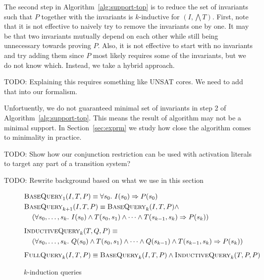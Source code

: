 The second step in Algorithm~\ref{alg:support-top} is to reduce the
set of invariants such that $P$ together with the invariants is
$k$-inductive for $(I, \bigwedge T)$. First, note that it is not
effective to naively try to remove the invariants one by one. It may
be that two invariants mutually depend on each other while still being
unnecessary towards proving $P$. Also, it is not effective to start
with no invariants and try adding them since $P$ most likely requires
some of the invariants, but we do not know which. Instead, we take a
hybrid approach.

TODO: Explaining this requires something like UNSAT cores. We need to
add that into our formalism.

Unfortuently, we do not guaranteed minimal set of invariants in step 2
of Algorithm~\ref{alg:support-top}. This means the result of algorithm
may not be a minimal support. In Section~\ref{sec:exprm} we study how
close the algorithm comes to minimality in practice.

TODO: Show how our conjunction restriction can be used with activation
literals to target any part of a transition system?

TODO: Rewrite background based on what we use in this section

\newcommand{\bq}{\textsc{BaseQuery}\xspace}
\newcommand{\iq}{\textsc{InductiveQuery}\xspace}
\newcommand{\fq}{\textsc{FullQuery}\xspace}

\newcommand{\mink}{\textsc{MinimizeK}\xspace}
\newcommand{\reduceinv}{\textsc{ReduceInvariants}\xspace}
\newcommand{\sos}{\textsc{SetOfSupport}\xspace}

\newcommand{\checksat}{\textsc{CheckSat}\xspace}
\newcommand{\unsatcore}{\textsc{UnsatCore}\xspace}
\newcommand{\unsat}{\textsc{UNSAT}\xspace}
\newcommand{\sat}{\textsc{SAT}\xspace}

\begin{figure}
\begin{align*}
  &\bq_1(I, T, P) \equiv \forall s_0.~ I(s_0) \Rightarrow P(s_0) \\
  &\bq_{k+1}(I, T, P) \equiv \bq_k(I, T, P) \land~ \\
%
  &\hspace{10pt}\left(\forall s_0, \ldots, s_k.~ I(s_0) \land T(s_0,
  s_1) \land \cdots \land T(s_{k-1}, s_k) \Rightarrow P(s_k)\right)
  \\[5pt]
  &\iq_k(T, Q, P) \equiv \\
%
  &\hspace{10pt}\left(\forall s_0, \ldots, s_k.~ Q(s_0) \land T(s_0,
  s_1) \land \cdots \land Q(s_{k-1}) \land T(s_{k-1}, s_k) \Rightarrow
  P(s_k)\right) \\[5pt]
  &\fq_k(I, T, P) \equiv \bq_k(I, T, P) \land \iq_k(T, P, P)
\end{align*}
\caption{$k$-induction queries}
\label{fig:queries}
\end{figure}

